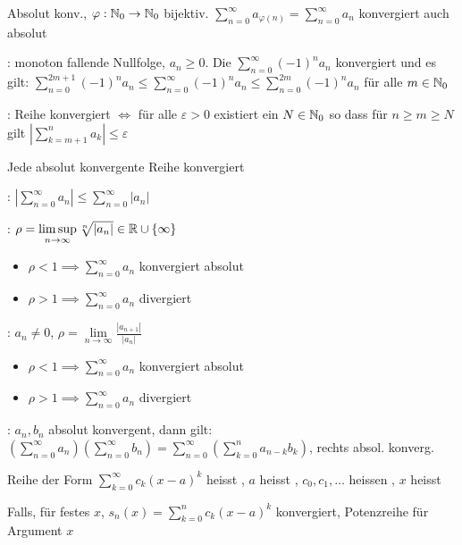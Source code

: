 \Satz {} Absolut konv., $\varphi: \mathbb{N}_0 \to \mathbb{N}_0$ bijektiv.
$\sum_{n=0}^{\infty} a_{\varphi(n)} = \sum_{n=0}^{\infty} a_n$ konvergiert auch absolut

\Satz {}: monoton fallende Nullfolge, $a_n \ge 0$.
Die  $\sum_{n=0}^{\infty} (-1)^n a_n$ konvergiert und es gilt:
$\sum_{n=0}^{2m+1} (-1)^n a_n\le \sum_{n=0}^{\infty} (-1)^n a_n\le \sum_{n=0}^{2m} (-1)^n a_n$ für alle $m \in \mathbb{N}_0$

\Satz {}: Reihe konvergiert $\iff$ für alle $\varepsilon > 0$ existiert ein $N \in \mathbb{N}_0$ so dass für $n\ge m\ge N$ gilt $|\sum_{k = m+1}^{n} a_k|\le \varepsilon$

\Satz Jede absolut konvergente Reihe konvergiert

\Satz {}: $\left|\sum\limits_{n=0}^{\infty} a_n \right|\le \sum\limits_{n=0}^{\infty}|a_n|$

\Satz {}: $\rho = \limsup\limits_{n\to\infty} \sqrt[n]{|a_n|} \in \mathbb{R} \cup \{\infty\}$
\vspace{-0.6em}
\begin{itemize}
    \item $\rho < 1 \implies \sum_{n=0}^{\infty} a_n$ konvergiert absolut
    \item $\rho > 1 \implies \sum_{n=0}^{\infty} a_n$ divergiert
\end{itemize}

\Satz {}: $a_n\ne 0$, $\rho = \lim\limits_{n\to\infty} \frac{|a_{n+1}|}{|a_n|}$
\vspace{-0.6em}
\begin{itemize}
    \item $\rho < 1 \implies \sum_{n=0}^{\infty} a_n$ konvergiert absolut
    \item $\rho > 1 \implies \sum_{n=0}^{\infty} a_n$ divergiert
\end{itemize}

\Satz {}: $a_n, b_n$ absolut konvergent, dann gilt:
$(\sum_{n=0}^{\infty} a_n)(\sum_{n=0}^{\infty} b_n) = \sum_{n=0}^{\infty} (\sum_{k=0}^{n} a_{n-k} b_k)$,
rechts absol. konverg.

\Def Reihe der Form $\sum_{k=0}^{\infty} c_k(x-a)^k$ heisst ,
$a$ heisst , $c_0, c_1, \ldots$ heissen , $x$ heisst 

\Def Falls, für festes $x$, $s_n(x) = \sum_{k=0}^{n} c_k (x-a)^k$ konvergiert,
Potenzreihe  für Argument $x$


